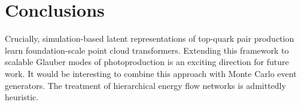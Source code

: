 \section{Conclusions}\label{sec:conclusions}

Crucially, simulation-based latent representations of top-quark pair
production learn foundation-scale point cloud transformers. Extending
this framework to scalable Glauber modes of photoproduction is an
exciting direction for future work. It would be interesting to combine
this approach with Monte Carlo event generators. The treatment of
hierarchical energy flow networks is admittedly heuristic.

